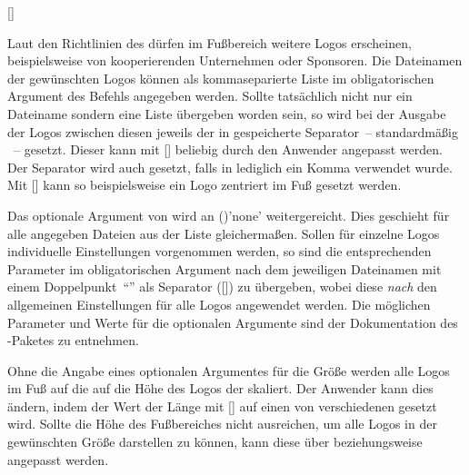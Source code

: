 \begin{Declaration*}{}
\begin{Declaration*}{}
\begin{Declaration*}{}
\begin{Declaration}[v2.03]{%
  [\LParameter{}]%
}
\begin{Declaration}[v2.03]{}
\begin{Declaration}[v2.03]{}
Laut den Richtlinien des \CDs dürfen im Fußbereich weitere Logos erscheinen, 
beispielsweise von kooperierenden Unternehmen oder Sponsoren. Die Dateinamen 
der gewünschten Logos können als kommaseparierte Liste im obligatorischen 
Argument des Befehls  angegeben werden. Sollte tatsächlich 
nicht nur ein Dateiname sondern eine Liste übergeben worden sein, so wird bei 
der Ausgabe der Logos zwischen diesen jeweils der in  
gespeicherte Separator~-- standardmäßig ~-- gesetzt. Dieser kann 
mit [\PParameter{\dots}] beliebig 
durch den Anwender angepasst werden. Der Separator wird auch gesetzt, falls in 
 lediglich ein Komma verwendet wurde. Mit 
[] kann so beispielsweise ein 
Logo zentriert im Fuß gesetzt werden.

Das optionale Argument von  wird an 
()'none' weitergereicht. Dies 
geschieht für alle angegeben Dateien aus der Liste gleichermaßen. Sollen für 
einzelne Logos individuelle Einstellungen vorgenommen werden, so sind die 
entsprechenden Parameter im obligatorischen Argument nach dem jeweiligen 
Dateinamen mit einem Doppelpunkt~\enquote{\PValue{:}} als Separator 
([]) zu 
übergeben, wobei diese \emph{nach} den allgemeinen Einstellungen für alle Logos 
angewendet werden. Die möglichen Parameter und Werte für die optionalen 
Argumente sind der Dokumentation des -Paketes zu entnehmen.

Ohne die Angabe eines optionalen Argumentes für die Größe werden alle Logos im 
Fuß auf die auf die Höhe des Logos der \TnUD skaliert. Der Anwender kann dies 
ändern, indem der Wert der Länge mit 
[]
auf einen von \PValue{0pt} verschiedenen gesetzt wird. Sollte die Höhe des 
Fußbereiches nicht ausreichen, um alle Logos in der gewünschten Größe 
darstellen zu können, kann diese über  
beziehungsweise  angepasst werden.
\end{Declaration}
\end{Declaration}
\end{Declaration}


\end{Declaration*}
\end{Declaration*}
\end{Declaration*}
